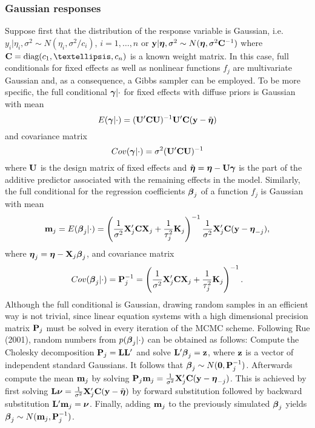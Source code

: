 \documentclass[11pt,a4paper,twoside]{bayesxarticle}
\begin{document}
\subsubsection{Gaussian responses}

Suppose first that the distribution of the response variable is
Gaussian, i.e. $y_i | \eta_i, \sigma^2 \sim N(\eta_i,\sigma^2/c_i)$,
$i=1,\dots,n$ or $\mathbf{y} | \boldsymbol{\eta}, \sigma^2 \sim N(\boldsymbol{\eta},\sigma^2 \mathbf{C}^{-1})$
where $\Cvec = \diag(c_1,\dots,c_n)$ is a known weight matrix. In this
case, full conditionals for fixed effects as well as nonlinear
functions $f_j$ are multivariate Gaussian and, as a consequence, a
Gibbs sampler can be employed. To be more specific, the full
conditional $\boldsymbol{\gamma} | \cdot$ for fixed effects with diffuse priors
is Gaussian with mean
\begin{equation}\label{meanfixed}
 E(\gammavec | \cdot) = (\Uvec'\Cvec  \Uvec)^{-1}\Uvec'\Cvec(\yvec-\tilde{\etavec})
\end{equation}
and covariance matrix
\begin{equation}
\label{covfixed} Cov(\gammavec | \cdot ) = \sigma^2 (\Uvec'\Cvec \Uvec)^{-1}
\end{equation}
where $\mathbf{U}$ is the design matrix of fixed effects and
$\tilde{\boldsymbol{\eta}}=\boldsymbol{\eta}-\mathbf{U} \boldsymbol{\gamma}$ is the part of the additive predictor
associated with the remaining effects in the model. Similarly, the
full conditional for the regression coefficients $\boldsymbol{\beta}_j$ of a
function $f_j$ is Gaussian with mean
\begin{equation}
\label{meangaussian} \mvec_j = E(\betavec_j | \cdot) = \left(
\frac{1}{\sigma^2} \Xvec_j' \Cvec \Xvec_j + \frac{1}{\tau_j^2} \Kvec_j \right)^{-1}
\frac{1}{\sigma^2}\Xvec_j' \Cvec(\yvec-\etavec_{-j}),
\end{equation}
where $\boldsymbol{\eta}_j=\boldsymbol{\eta}-\mathbf{X}_j\boldsymbol{\beta}_j$, and covariance matrix
\begin{equation}
\label{covgaussian} Cov(\betavec_j | \cdot) = \Pvec_j^{-1} = \left(
\frac{1}{\sigma^2} \Xvec_j' \Cvec \Xvec_j + \frac{1}{\tau_j^2} \Kvec_j \right)^{-1}.
\end{equation}
Although the full conditional is Gaussian, drawing random samples in
an efficient way is not trivial, since linear equation systems with
a high dimensional precision matrix $\mathbf{P}_j$ must be solved in every
iteration of the MCMC scheme. Following Rue (2001), random numbers
from $p(\boldsymbol{\beta}_j | \cdot)$ can be obtained as follows: Compute the
Cholesky decomposition $\mathbf{P}_j = \mathbf{L} \mathbf{L}'$ and solve $\mathbf{L}' \boldsymbol{\beta}_j = \mathbf{z}$,
where $\mathbf{z}$ is a vector of independent standard Gaussians. It follows
that $\boldsymbol{\beta}_j \sim N(\boldsymbol{0},\mathbf{P}_j^{-1})$. Afterwards compute the mean $\mathbf{m}_j$
by solving $\mathbf{P}_j \mathbf{m}_j = \frac{1}{\sigma^2} \mathbf{X}_j'\mathbf{C}(\mathbf{y}-\boldsymbol{\eta}_{-j})$. This
is achieved by first solving $\mathbf{L} \boldsymbol{\nu} = \frac{1}{\sigma^2}
\mathbf{X}_j'\mathbf{C}(\mathbf{y}-\tilde{\boldsymbol{\eta}})$ by forward substitution followed by backward
substitution $\mathbf{L}' \mathbf{m}_j = \boldsymbol{\nu}$. Finally, adding $\mathbf{m}_j$ to the previously
simulated $\boldsymbol{\beta}_j$ yields $\boldsymbol{\beta}_j \sim N(\mathbf{m}_j,\mathbf{P}_j^{-1})$.
\end{document}

